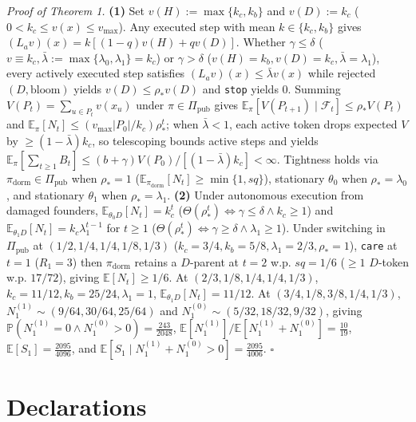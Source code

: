 \documentclass[11pt,letterpaper]{article}
\begin{document}
\emph{Proof of Theorem 1.} \textbf{(1)} Set \(v(H) := \max\{k_c, k_b\}\)
and \(v(D) := k_c\) (\(0 < k_c \le v(x) \le v_{\max}\)). Any executed
step with mean \(k \in \{k_c, k_b\}\) gives
\((L_a v)(x) = k[(1-q)v(H) + q v(D)]\). Whether \(\gamma \le \delta\)
(\(v \equiv k_c, \bar{\lambda} := \max\{\lambda_0,\lambda_1\} = k_c\))
or \(\gamma > \delta\)
(\(v(H)=k_b, v(D)=k_c, \bar{\lambda}=\lambda_1\)), every actively
executed step satisfies \((L_a v)(x) \le \bar{\lambda} v(x)\) while
rejected \((D,\mathrm{bloom})\) yields \(v(D) \le \rho_* v(D)\) and
\texttt{stop} yields \(0\). Summing \(V(P_t) = \sum_{u\in P_t} v(x_u)\)
under \(\pi \in \Pi_{\mathrm{pub}}\) gives
\(\mathbb{E}_\pi[V(P_{t+1})\mid \mathcal{F}_t] \le \rho_* V(P_t)\) and
\(\mathbb{E}_\pi[N_t] \le (v_{\max}|P_0|/k_c)\rho_*^t\); when
\(\bar{\lambda} < 1\), each active token drops expected \(V\) by
\(\ge (1-\bar{\lambda})k_c\), so telescoping bounds active steps and
yields
\(\mathbb{E}_\pi[\sum_{t\ge 1} B_t] \le (b+\gamma)V(P_0)/[(1-\bar{\lambda})k_c] < \infty\).
Tightness holds via \(\pi_{\mathrm{dorm}} \in \Pi_{\mathrm{pub}}\) when
\(\rho_*=1\)
(\(\mathbb{E}_{\pi_{\mathrm{dorm}}}[N_t] \ge \min\{1, sq\}\)),
stationary \(\theta_0\) when \(\rho_*=\lambda_0\), and stationary
\(\theta_1\) when \(\rho_*=\lambda_1\). \textbf{(2)} Under autonomous
execution from damaged founders,
\(\mathbb{E}_{\theta_0 D}[N_t] = k_c^t\)
(\(\Theta(\rho_*^t) \iff \gamma\le\delta \land k_c\ge 1\)) and
\(\mathbb{E}_{\theta_1 D}[N_t] = k_c \lambda_1^{t-1}\) for \(t \ge 1\)
(\(\Theta(\rho_*^t) \iff \gamma\ge\delta \land \lambda_1\ge 1\)). Under
switching in \(\Pi_{\mathrm{pub}}\) at \((1/2,1/4,1/4,1/8,1/3)\)
(\(k_c=3/4, k_b=5/8, \lambda_1=2/3, \rho_*=1\)), \texttt{care} at
\(t=1\) (\(R_1=3\)) then \(\pi_{\mathrm{dorm}}\) retains a \(D\)-parent
at \(t=2\) w.p. \(sq = 1/6\) (\(\ge 1\) \(D\)-token w.p. \(17/72\)),
giving \(\mathbb{E}[N_t] \ge 1/6\). At \((2/3,1/8,1/4,1/4,1/3)\),
\(k_c=11/12, k_b=25/24, \lambda_1=1\),
\(\mathbb{E}_{\theta_1 D}[N_t] = 11/12\). At \((3/4,1/8,3/8,1/4,1/3)\),
\(N_1^{(1)} \sim (9/64, 30/64, 25/64)\) and
\(N_1^{(0)} \sim (5/32, 18/32, 9/32)\), giving
\(\mathbb{P}(N_1^{(1)}=0 \land N_1^{(0)}>0) = \frac{243}{2048}\),
\(\mathbb{E}[N_1^{(1)}]/\mathbb{E}[N_1^{(1)}+N_1^{(0)}] = \frac{10}{19}\),
\(\mathbb{E}[S_1] = \frac{2095}{4096}\), and
\(\mathbb{E}[S_1 \mid N_1^{(1)}+N_1^{(0)} > 0] = \frac{2095}{4006}\).
\(\square\)

\section*{Declarations}\label{declarations}
\end{document}
